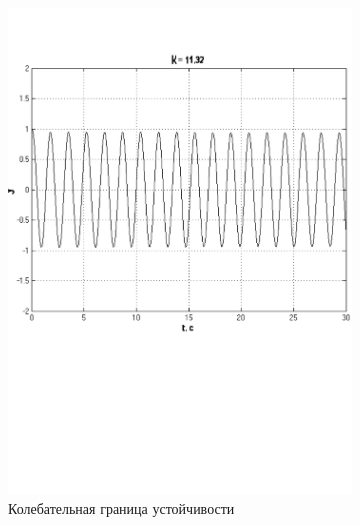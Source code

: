 \documentclass[a4paper, 11pt, russian]{article}
\begin{document}
\begin{figure}[ht!]
        \begin{subfigure}[b]{0.48\textwidth}
            \includegraphics[width = \textwidth]{oscillatoryStabilityLimit}
            \centering
            \caption{Колебательная граница устойчивости}
        \end{subfigure}
        \hfill
        \begin{subfigure}[b]{0.48\textwidth}

\end{subfigure}
\end{figure}
\end{document}
